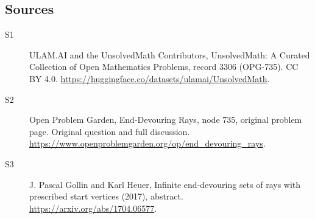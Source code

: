 \documentclass[11pt]{article}
\begin{document}
\subsection{Sources}
\begin{description}
\item[\hypertarget{source:3306:1}{S1}] ULAM.AI and the UnsolvedMath Contributors, UnsolvedMath: A Curated Collection of Open Mathematics Problems, record 3306 (OPG-735). CC BY 4.0. \url{https://huggingface.co/datasets/ulamai/UnsolvedMath}.
\item[\hypertarget{source:3306:2}{S2}] Open Problem Garden, End-Devouring Rays, node 735, original problem page. Original question and full discussion. \url{https://www.openproblemgarden.org/op/end_devouring_rays}.
\item[\hypertarget{source:3306:3}{S3}] J. Pascal Gollin and Karl Heuer, Infinite end-devouring sets of rays with prescribed start vertices (2017), abstract. \url{https://arxiv.org/abs/1704.06577}.
\end{description}
\label{end:3306}
\end{document}
